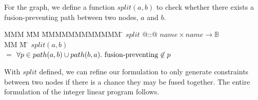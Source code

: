 For the graph, we define a function $split(a,b)$ to check whether there exists a fusion-preventing path between two nodes, $a$ and $b$.

\begin{tabbing}
MMM      \= MM   \=  MMMMMMMMMMMM    \=  \kill
$split$     \> @::@ \> $name \times name \to \mathbb{B}$      \\
MM        \= M    \= \kill
$split(a,b)$ \\
    \>$=$  \>$\forall p \in path(a,b) \cup path(b,a).\ \fusionpreventing \not\in p$\\
\end{tabbing}

With $split$ defined, we can refine our formulation to only generate constraints between two nodes if there is a chance they may be fused together.
The entire formulation of the integer linear program follows.


